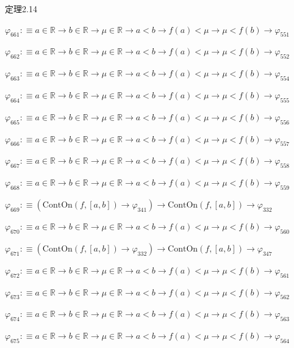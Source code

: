 \begin{fullproof}{定理2.14}
\begin{abbrevlist}
\item $\varphi_{661} :\equiv a \in \mathbb{R} \to b \in \mathbb{R} \to \mu \in \mathbb{R} \to a < b \to f(a) < \mu \to \mu < f(b) \to \varphi_{551}$
\item $\varphi_{662} :\equiv a \in \mathbb{R} \to b \in \mathbb{R} \to \mu \in \mathbb{R} \to a < b \to f(a) < \mu \to \mu < f(b) \to \varphi_{552}$
\item $\varphi_{663} :\equiv a \in \mathbb{R} \to b \in \mathbb{R} \to \mu \in \mathbb{R} \to a < b \to f(a) < \mu \to \mu < f(b) \to \varphi_{554}$
\item $\varphi_{664} :\equiv a \in \mathbb{R} \to b \in \mathbb{R} \to \mu \in \mathbb{R} \to a < b \to f(a) < \mu \to \mu < f(b) \to \varphi_{555}$
\item $\varphi_{665} :\equiv a \in \mathbb{R} \to b \in \mathbb{R} \to \mu \in \mathbb{R} \to a < b \to f(a) < \mu \to \mu < f(b) \to \varphi_{556}$
\item $\varphi_{666} :\equiv a \in \mathbb{R} \to b \in \mathbb{R} \to \mu \in \mathbb{R} \to a < b \to f(a) < \mu \to \mu < f(b) \to \varphi_{557}$
\item $\varphi_{667} :\equiv a \in \mathbb{R} \to b \in \mathbb{R} \to \mu \in \mathbb{R} \to a < b \to f(a) < \mu \to \mu < f(b) \to \varphi_{558}$
\item $\varphi_{668} :\equiv a \in \mathbb{R} \to b \in \mathbb{R} \to \mu \in \mathbb{R} \to a < b \to f(a) < \mu \to \mu < f(b) \to \varphi_{559}$
\item $\varphi_{669} :\equiv (\mathrm{ContOn}(f,[a,b]) \to \varphi_{341}) \to \mathrm{ContOn}(f,[a,b]) \to \varphi_{332}$
\item $\varphi_{670} :\equiv a \in \mathbb{R} \to b \in \mathbb{R} \to \mu \in \mathbb{R} \to a < b \to f(a) < \mu \to \mu < f(b) \to \varphi_{560}$
\item $\varphi_{671} :\equiv (\mathrm{ContOn}(f,[a,b]) \to \varphi_{332}) \to \mathrm{ContOn}(f,[a,b]) \to \varphi_{347}$
\item $\varphi_{672} :\equiv a \in \mathbb{R} \to b \in \mathbb{R} \to \mu \in \mathbb{R} \to a < b \to f(a) < \mu \to \mu < f(b) \to \varphi_{561}$
\item $\varphi_{673} :\equiv a \in \mathbb{R} \to b \in \mathbb{R} \to \mu \in \mathbb{R} \to a < b \to f(a) < \mu \to \mu < f(b) \to \varphi_{562}$
\item $\varphi_{674} :\equiv a \in \mathbb{R} \to b \in \mathbb{R} \to \mu \in \mathbb{R} \to a < b \to f(a) < \mu \to \mu < f(b) \to \varphi_{563}$
\item $\varphi_{675} :\equiv a \in \mathbb{R} \to b \in \mathbb{R} \to \mu \in \mathbb{R} \to a < b \to f(a) < \mu \to \mu < f(b) \to \varphi_{564}$

\end{abbrevlist}
\end{fullproof}
